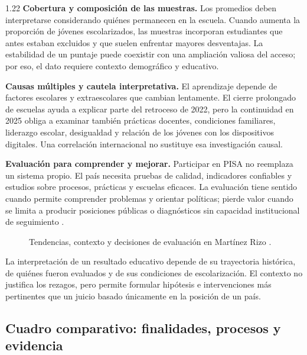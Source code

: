 \documentclass[spanish,letterpaper,oneside]{article}
\begin{document}
\begin{reportelecturabox}[title={Reporte de lectura 3: Felipe Martínez Rizo}]
\begin{spacing}{1.22}
\medskip\noindent\textbf{Cobertura y composición de las muestras.}\enspace
Los promedios deben interpretarse considerando quiénes permanecen en la escuela. Cuando aumenta la proporción de jóvenes escolarizados, las muestras incorporan estudiantes que antes estaban excluidos y que suelen enfrentar mayores desventajas. La estabilidad de un puntaje puede coexistir con una ampliación valiosa del acceso; por eso, el dato requiere contexto demográfico y educativo.

\medskip\noindent\textbf{Causas múltiples y cautela interpretativa.}\enspace
El aprendizaje depende de factores escolares y extraescolares que cambian lentamente. El cierre prolongado de escuelas ayuda a explicar parte del retroceso de 2022, pero la continuidad en 2025 obliga a examinar también prácticas docentes, condiciones familiares, liderazgo escolar, desigualdad y relación de los jóvenes con los dispositivos digitales. Una correlación internacional no sustituye esa investigación causal.

\medskip\noindent\textbf{Evaluación para comprender y mejorar.}\enspace
Participar en PISA no reemplaza un sistema propio. El país necesita pruebas de calidad, indicadores confiables y estudios sobre procesos, prácticas y escuelas eficaces. La evaluación tiene sentido cuando permite comprender problemas y orientar políticas; pierde valor cuando se limita a producir posiciones públicas o diagnósticos sin capacidad institucional de seguimiento \citep{martinezRizo2026pisa}.
\end{spacing}
\end{reportelecturabox}

\begin{figure}[H]
\centering
\resizebox{\linewidth}{!}{\MapaMartinez}
\caption{Tendencias, contexto y decisiones de evaluación en Martínez Rizo \citep{martinezRizo2026pisa}.}
\label{fig:mapa-martinez}
\end{figure}
La interpretación de un resultado educativo depende de su trayectoria histórica, de quiénes fueron evaluados y de sus condiciones de escolarización. El contexto no justifica los rezagos, pero permite formular hipótesis e intervenciones más pertinentes que un juicio basado únicamente en la posición de un país.

\clearpage
\subsection{Cuadro comparativo: finalidades, procesos y evidencia}
\end{document}
